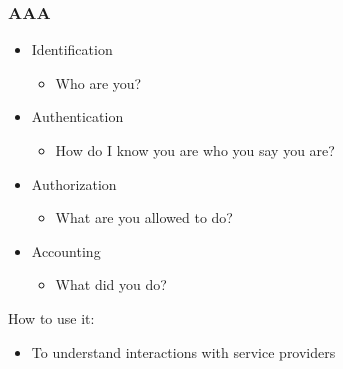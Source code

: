 \documentclass[blue]{beamer}
\begin{document}
\begin{frame}
\frametitle{AAA}

\begin{itemize}
  \item Identification
  \begin{itemize}
    \item Who are you?
  \end{itemize}
  \item Authentication
  \begin{itemize}
    \item How do I know you are who you say you are?
  \end{itemize}
\item Authorization
  \begin{itemize}
    \item What are you allowed to do?
  \end{itemize}
  \item Accounting
  \begin{itemize}
    \item What did you do?
  \end{itemize}
\end{itemize}

\begin{alertblock}{How to use it:}
\begin{itemize}
  \item To understand interactions with service providers
\end{itemize}
\end{alertblock}

\end{frame}
\end{document}
